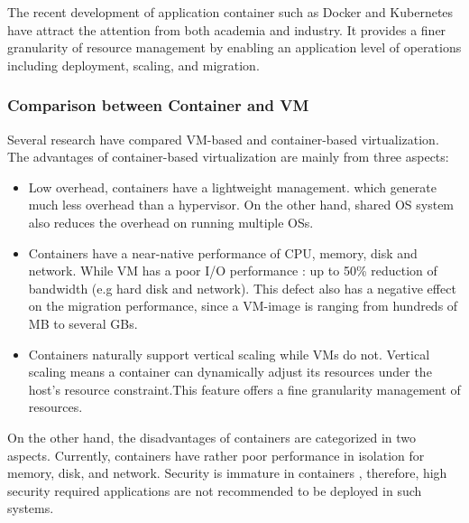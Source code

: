 The recent development of application container such as Docker and Kubernetes \cite{Bernstein:2014ur} have attract the attention from both academia and industry. It provides a finer granularity of resource management by enabling an application level of operations including deployment, scaling, and migration.  



\subsubsection{Comparison between Container and VM}
Several research \cite{Felter:2015ki, Xavier:2013fy, Dua:2014bw} have compared VM-based and container-based virtualization. The advantages of container-based virtualization are mainly from three aspects:

\begin{itemize}
	\item Low overhead, containers have a lightweight management. which generate much less overhead than a hypervisor. On the other hand, shared OS system also reduces the overhead on running multiple OSs. 
	\item Containers have a near-native performance of CPU, memory, disk and network. While VM has a poor I/O performance \cite{Shafer:2010vh}: up to 50\% reduction of bandwidth (e.g hard disk and network). This defect also has a negative effect on the migration performance, since a VM-image is ranging from hundreds of MB to several GBs. 
	\item Containers naturally support vertical scaling while VMs do not. Vertical scaling means a container can dynamically adjust its resources under the host's resource constraint.This feature offers a fine granularity management of resources. 
\end{itemize}
	
On the other hand, the disadvantages of containers are categorized in two aspects. Currently, containers have rather poor performance in isolation for memory, disk, and network. Security is immature in containers \cite{Bernstein:2014ur}, therefore, high security required applications are not recommended to be deployed in such systems.

